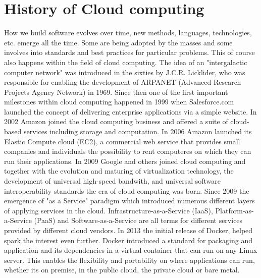 \section{History of Cloud computing}
How we build software evolves over time, new methods, languages, technologies, etc. emerge all the time. Some are being adopted by the masses and some involves into standards and best practices for particular problems. This of course also happens within the field of cloud computing. The idea of an "intergalactic computer network" was introduced in the sixties by J.C.R. Licklider, who was responsible for enabling the development of ARPANET (Advanced Research Projects Agency Network) in 1969\cite{history_of_cloud_computing}. Since then one of the first important milestones within cloud computing happened in 1999 when Salesforce.com launched the concept of delivering enterprise applications via a simple website. In 2002 Amazon joined the cloud computing business and offered a suite of cloud-based services including storage and computation. In 2006 Amazon launched its Elastic Compute cloud (EC2), a commercial web service that provides small companies and individuals the possibility to rent computeres on which they can run their applications. In 2009 Google and others joined cloud computing and together with the evolution and maturing of virtualization technology, the development of universal high-speed bandwith, and universal software interoperability standards the era of cloud computing was born. Since 2009 the emergence of "as a Service" paradigm which introduced numerous different layers of applying services in the cloud. Infrastructure-as-a-Service (IaaS), Platform-as-a-Service (PaaS) and Software-as-a-Service are all terms for different services provided by different cloud vendors. In 2013 the initial release of Docker, helped spark the interest even further. Docker introduced a standard for packaging and application and its dependencies in a virtual container that can run on any Linux server. This enables the flexibility and portability on where applications can run, whether its on premise, in the public cloud, the private cloud or bare metal.

